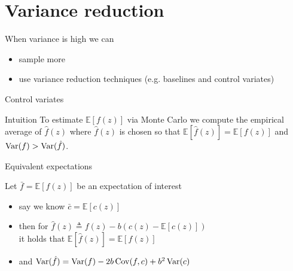 \section{Variance reduction}

\begin{frame}{When variance is high we can}

\pause

\begin{itemize}
	\item sample more \\ \pause
	\item use variance reduction techniques (e.g. baselines and control variates)\\ 
\end{itemize}
\end{frame}

\begin{frame}{Control variates}

\begin{alertblock}{Intuition}
To estimate $\mathbb E[f(z)]$ via Monte Carlo we compute the empirical average of $\hat f(z)$ where $\hat f(z)$ is chosen so that $\mathbb E[\hat f(z)] = \mathbb E[f(z)]$ and $\operatorname{Var}(f) > \operatorname{Var}(\hat f)$.
\end{alertblock}

\end{frame}



\begin{frame}{Equivalent expectations}

Let $\bar f = \mathbb E[f(z)]$ be an expectation of interest \pause
\begin{itemize}
	\item say we know $\bar c = \mathbb E[c(z)]$ \pause
	\item then for $\hat f(z) \triangleq f(z) - b(c(z) - \mathbb E[c(z)])$ \\ \pause
	it holds that $\mathbb E[\hat f(z)] = \mathbb E[f(z)]$ \pause
	\item and $\operatorname{Var}(\hat f) = \operatorname{Var}(f) - 2b \operatorname{Cov}(f, c) + b^2 \operatorname{Var}(c)$ 
\end{itemize}

\end{frame}

